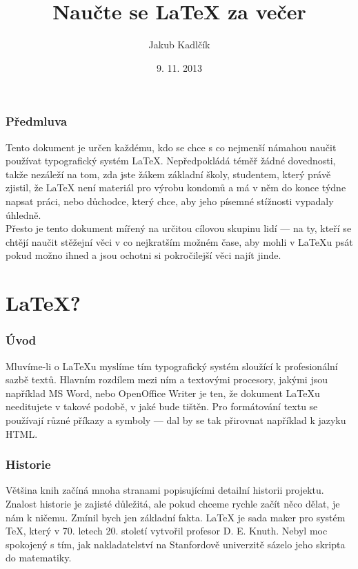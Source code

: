 \documentclass[10pt,a4paper]{article}
\title{Naučte se \LaTeX{} za večer}
\author{Jakub Kadlčík}
\date{9. 11. 2013}
\begin{document}
	\maketitle
	\newpage

	\section*{Předmluva}
	Tento dokument je určen každému, kdo se chce s co nejmenší námahou naučit používat typografický systém LaTeX. Nepředpokládá téměř žádné dovednosti, takže nezáleží na tom, zda jste žákem základní školy, studentem, který právě zjistil, že LaTeX není materiál pro výrobu kondomů a má v něm do konce týdne napsat práci, nebo důchodce, který chce, aby jeho písemné stížnosti vypadaly úhledně.
	\\
	Přesto je tento dokument mířený na určitou cílovou skupinu lidí --- na ty, kteří se chtějí naučit stěžejní věci v co nejkratším možném čase, aby mohli v LaTeXu psát pokud možno ihned a jsou ochotni si pokročilejší věci najít jinde.

	\newpage
	\tableofcontents
	\newpage	
	\setcounter{page}{4}
    \part{LaTeX?}
		\section{Úvod}
		Mluvíme-li o LaTeXu myslíme tím typografický systém sloužící k profesionální sazbě textů. Hlavním rozdílem mezi ním a textovými procesory, jakými jsou například MS Word, nebo OpenOffice Writer je ten, že dokument LaTeXu needitujete v takové podobě, v jaké bude tištěn. Pro formátování textu se používají různé příkazy a symboly --- dal by se tak přirovnat například k jazyku HTML.

		\section{Historie}
		Většina knih začíná mnoha stranami popisujícími detailní historii projektu. Znalost historie je zajisté důležitá, ale pokud chceme rychle začít něco dělat, je nám k ničemu. Zmínil bych jen základní fakta. LaTeX je sada maker pro systém TeX, který v 70. letech 20. století vytvořil profesor D. E. Knuth. Nebyl moc spokojený s tím, jak nakladatelství na  Stanfordově univerzitě sázelo jeho skripta do matematiky.
\end{document}
